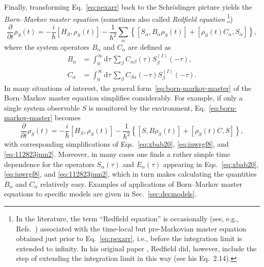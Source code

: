 \documentclass[3p,sort&compress]{elsarticle}
\newcommand{\D}{\ensuremath{\mathrm{d}}}
\newcommand{\I}{\ensuremath{i}}
\newcommand{\op}[1]{#1}
\begin{document}
Finally, transforming Eq.~\eqref{eq:pexarr} back to the Schr\"odinger picture yields the \emph{Born--Markov master equation} (sometimes also called 
\emph{Redfield equation} \cite{Redfield:1957:im,Blum:1981:qq}\footnote{In the literature, the term  ``Redfield equation'' is occasionally (see, e.g., Refs.~\cite{Breuer:2002:oq,Hornberger:2009:aq}) associated with the time-local but pre-Markovian master equation obtained just prior to Eq.~\eqref{eq:pexarr}, i.e., before the integration limit is extended to infinity. In his original paper \cite{Redfield:1957:im}, Redfield did, however,  include the step of extending the integration limit in this way (see his Eq.~2.14).})
%
\begin{equation}
\label{eq:born-markov-master}
\frac{\partial}{\partial t} \op{\rho}_S(t) = -\frac{\I}{\hbar} \left[ \op{H}_S, \op{\rho}_S(t) \right] - \frac{1}{\hbar^2}\sum_{\alpha} \left\{ \left[
\op{S}_\alpha, B_\alpha \op{\rho}_S(t) \right] + \left[ \op{\rho}_S(t) C_\alpha, \op{S}_\alpha \right] \right\},
\end{equation}
%
where the system operators $B_\alpha$ and $C_\alpha$ are defined as
%
\begin{subequations} \label{eq:hvdwg643r5gsxkjcvbsvnx20}
\begin{align}
\label{eq:iuwrgf8}
B_\alpha &=\int_0^\infty \D \tau \, \sum_{\beta}
C_{\alpha\beta}(\tau)  S^{(I)}_\beta(-\tau),
\\ \label{eq:112823jmn2} C_\alpha &= \int_0^\infty \D \tau \,
\sum_{\beta} C_{\beta\alpha}(-\tau)  S^{(I)}_\beta(-\tau).
\end{align}
\end{subequations}
%
In many situations of interest, the general form~\eqref{eq:born-markov-master} of the Born--Markov master equation simplifies considerably. For example, if only a single system observable $S$ is monitored by the environment, Eq.~\eqref{eq:born-markov-master} becomes
%
\begin{equation}
\label{eq:born-markov-mastersim}
\frac{\partial}{\partial t} \op{\rho}_S(t) = -\frac{\I}{\hbar} \left[ \op{H}_S, \op{\rho}_S(t) \right] - \frac{1}{\hbar^2}\left\{\left[
\op{S}, B \op{\rho}_S(t) \right] + \left[ \op{\rho}_S(t) C, \op{S} \right]\right\},
\end{equation}
%
with corresponding simplifications of Eqs.~\eqref{eq:xbab20}, \eqref{eq:iuwrgf8}, and \eqref{eq:112823jmn2}. Moreover, in many cases one finds a rather simple time dependence for the operators $\op{S}_\alpha(\tau)$ and $E_\alpha(\tau)$ appearing in Eqs.~\eqref{eq:xbab20}, \eqref{eq:iuwrgf8}, and \eqref{eq:112823jmn2}, which in turn makes calculating the quantities $B_\alpha$ and $C_\alpha$ relatively easy. Examples of applications of Born--Markov master equations to specific models are given in Sec.~\ref{sec:decmodels}.
 
\end{document}
